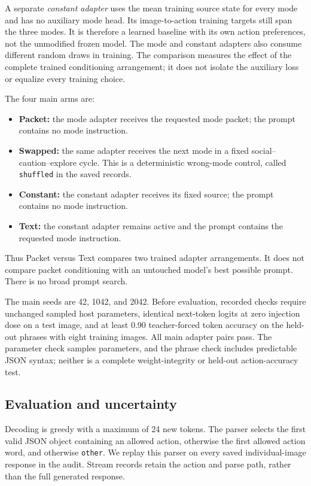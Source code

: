 \documentclass[10pt]{article}
\begin{document}
A separate \emph{constant adapter} uses the mean training source state
for every mode and has no auxiliary mode head. Its image-to-action
training targets still span the three modes. It is therefore a learned
baseline with its own action preferences, not the unmodified frozen
model. The mode and constant adapters also consume different random
draws in training. The comparison measures the effect of the complete
trained conditioning arrangement; it does not isolate the auxiliary
loss or equalize every training choice.

The four main arms are:
\begin{itemize}
\item \textbf{Packet:} the mode adapter receives the requested mode
packet; the prompt contains no mode instruction.
\item \textbf{Swapped:} the same adapter receives the next mode in a
fixed social--caution--explore cycle. This is a deterministic wrong-mode
control, called \texttt{shuffled} in the saved records.
\item \textbf{Constant:} the constant adapter receives its fixed source;
the prompt contains no mode instruction.
\item \textbf{Text:} the constant adapter remains active and the prompt
contains the requested mode instruction.
\end{itemize}
Thus Packet versus Text compares two trained adapter arrangements.
It does not compare packet conditioning with an untouched model's
best possible prompt. There is no broad prompt search.

The main seeds are 42, 1042, and 2042. Before evaluation, recorded checks
require unchanged sampled host parameters, identical next-token logits
at zero injection dose on a test image, and at least 0.90 teacher-forced
token accuracy on the held-out phrases with eight training images.
All main adapter pairs pass. The parameter check samples parameters,
and the phrase check includes predictable JSON syntax; neither is a
complete weight-integrity or held-out action-accuracy test.

\subsection{Evaluation and uncertainty}
Decoding is greedy with a maximum of 24 new tokens. The parser selects
the first valid JSON object containing an allowed action, otherwise
the first allowed action word, and otherwise \texttt{other}. We replay
this parser on every saved individual-image response in the audit.
Stream records retain the action and parse path, rather than the full
generated response.
\end{document}
